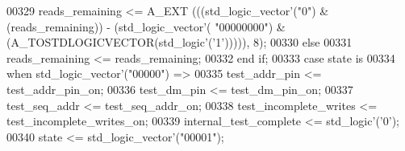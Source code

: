 \begin{DoxyCode}
00329         \textcolor{vhdlchar}{reads_remaining} \textcolor{vhdlchar}{<=} \textcolor{vhdlchar}{A\_EXT} \textcolor{vhdlchar}{(}\textcolor{vhdlchar}{(}\textcolor{vhdlchar}{(}\textcolor{comment}{std\_logic\_vector}\textcolor{vhdlchar}{'}\textcolor{vhdlchar}{(}\textcolor{vhdllogic}{"0"}\textcolor{vhdlchar}{)} \textcolor{vhdlchar}{&} \textcolor{vhdlchar}{(}\textcolor{vhdlchar}{reads_remaining}\textcolor{vhdlchar}{)}\textcolor{vhdlchar}{)} \textcolor{vhdlchar}{-} \textcolor{vhdlchar}{(}\textcolor{comment}{std\_logic\_vector}\textcolor{vhdlchar}{'}\textcolor{vhdlchar}{(}\textcolor{vhdllogic}{
      "00000000"}\textcolor{vhdlchar}{)} \textcolor{vhdlchar}{&} \textcolor{vhdlchar}{(}\textcolor{vhdlchar}{A\_TOSTDLOGICVECTOR}\textcolor{vhdlchar}{(}\textcolor{comment}{std\_logic}\textcolor{vhdlchar}{'}\textcolor{vhdlchar}{(}\textcolor{vhdlchar}{'}\textcolor{vhdllogic}{}\textcolor{vhdllogic}{1}\textcolor{vhdlchar}{'}\textcolor{vhdlchar}{)}\textcolor{vhdlchar}{)}\textcolor{vhdlchar}{)}\textcolor{vhdlchar}{)}\textcolor{vhdlchar}{)}\textcolor{vhdlchar}{,} \textcolor{vhdllogic}{}\textcolor{vhdllogic}{8}\textcolor{vhdlchar}{)};
00330       \textcolor{keywordflow}{else}
00331         \textcolor{vhdlchar}{reads_remaining} \textcolor{vhdlchar}{<=} \textcolor{vhdlchar}{reads_remaining};
00332       \textcolor{keywordflow}{end} \textcolor{keywordflow}{if};
00333       \textcolor{keywordflow}{case} \textcolor{vhdlchar}{state} \textcolor{keywordflow}{is}
00334           \textcolor{keywordflow}{when} \textcolor{comment}{std\_logic\_vector}\textcolor{vhdlchar}{'}\textcolor{vhdlchar}{(}\textcolor{vhdllogic}{"00000"}\textcolor{vhdlchar}{)} \textcolor{vhdlchar}{=}\textcolor{vhdlchar}{>} 
00335               \textcolor{vhdlchar}{test_addr_pin} \textcolor{vhdlchar}{<=} \textcolor{vhdlchar}{test_addr_pin_on};
00336               \textcolor{vhdlchar}{test_dm_pin} \textcolor{vhdlchar}{<=} \textcolor{vhdlchar}{test_dm_pin_on};
00337               \textcolor{vhdlchar}{test_seq_addr} \textcolor{vhdlchar}{<=} \textcolor{vhdlchar}{test_seq_addr_on};
00338               \textcolor{vhdlchar}{test_incomplete_writes} \textcolor{vhdlchar}{<=} \textcolor{vhdlchar}{test_incomplete_writes_on};
00339               \textcolor{vhdlchar}{internal_test_complete} \textcolor{vhdlchar}{<=} \textcolor{comment}{std\_logic}\textcolor{vhdlchar}{'}\textcolor{vhdlchar}{(}\textcolor{vhdlchar}{'}\textcolor{vhdllogic}{}\textcolor{vhdllogic}{0}\textcolor{vhdlchar}{'}\textcolor{vhdlchar}{)};
00340               \textcolor{vhdlchar}{state} \textcolor{vhdlchar}{<=} \textcolor{comment}{std\_logic\_vector}\textcolor{vhdlchar}{'}\textcolor{vhdlchar}{(}\textcolor{vhdllogic}{"00001"}\textcolor{vhdlchar}{)};

\end{DoxyCode}
